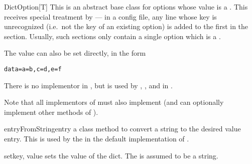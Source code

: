 \begin{classdesc}{DictOption[T]}{}
  This is an abstract base class for options whose value is a
  . This receives special treatment by
   --- in a config file, any line whose key is
  unrecognized (i.e.\ not the key of an existing option) is added to the first
   in the section. Usually, such sections only contain a
  single option which is a .

  The value can also be set directly, in the form
\begin{verbatim}
data=a=b,c=d,e=f
\end{verbatim}

  There is no implementor in , but is used by
  , ,  and  in
  .

  Note that all implementors of  must also implement
   (and can optionally implement other methods of
  ).
\end{classdesc}

\begin{methoddesc}[DictOption]{entryFromString}{entry}
  a class method to convert a string to the desired value entry. This is used
  by the in the default implementation of .
\end{methoddesc}

\begin{methoddesc}[DictOption]{set}{key, value}
  sets the value of the dict. The  is assumed to be a string.
\end{methoddesc}
